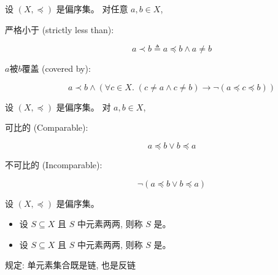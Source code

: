 \begin{frame}{}
  \begin{definition}
    设 $(X, \preceq)$ 是偏序集。
    对任意 $a, b \in X$,

    \begin{description}
      \item[严格小于 (strictly less than):]
        \[
          a \prec b \triangleq a \preceq b \land a \neq b
        \]
      \item[$a$被$b$覆盖 (covered by):]
        \[
          a \prec b \land
            (\forall c \in X.\; (c \neq a \land c \neq b) \to \lnot (a \preceq c \preceq b))
        \]
    \end{description}
  \end{definition}

\end{frame}

\begin{frame}{}
  \begin{definition}
    设 $(X, \preceq)$ 是偏序集。
    对 $a, b \in X$,

    \begin{description}
      \item[可比的 (Comparable):]
        \[
          a \preceq b \lor b \preceq a
        \]
      \item[不可比的 (Incomparable):]
        \[
          \lnot(a \preceq b \lor b \preceq a)
        \]
    \end{description}
  \end{definition}

\end{frame}

\begin{frame}{}
  \begin{definition}
    设 $(X, \preceq)$ 是偏序集。

    \begin{itemize}
      \setlength{\itemsep}{6pt}
      \item 设 $S \subseteq X$ 且 $S$ 中元素两两, 则称 $S$ 是。
      \item 设 $S \subseteq X$ 且 $S$ 中元素两两, 则称 $S$ 是。
    \end{itemize}
  \end{definition}

  \begin{center}
    规定: 单元素集合既是链, 也是反链
  \end{center}

\end{frame}

